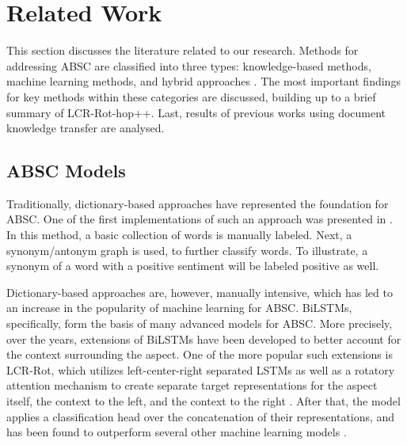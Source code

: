 \section{Related Work}
\label{sec:literature}
This section discusses the literature related to our research. Methods for addressing ABSC are classified into three types: knowledge-based methods, machine learning methods, and hybrid approaches \cite{brauwers2021}. The most important findings for key methods within these categories are discussed, building up to a brief summary of LCR-Rot-hop++. Last, results of previous works using document knowledge transfer are analysed.

\subsection{ABSC Models}

Traditionally, dictionary-based approaches have represented the foundation for ABSC. One of the first implementations of such an approach was presented in \cite{Hu2004}. In this method, a basic collection of words is manually labeled. Next, a synonym/antonym graph is used, to further classify words. To illustrate, a synonym of a word with a positive sentiment will be labeled positive as well.

Dictionary-based approaches are, however, manually intensive, which has led to an increase in the popularity of machine learning for ABSC. BiLSTMs, specifically, form the basis of many advanced models for ABSC. More precisely, over the years, extensions of BiLSTMs have been developed to better account for the context surrounding the aspect. One of the more popular such extensions is LCR-Rot, which utilizes left-center-right separated LSTMs as well as a rotatory attention mechanism to create separate target representations for the aspect itself, the context to the left, and the context to the right \cite{Zheng2018}. After that, the model applies a classification head over the concatenation of their representations, and has been found to outperform several other machine learning models \cite{Zheng2018}. 


